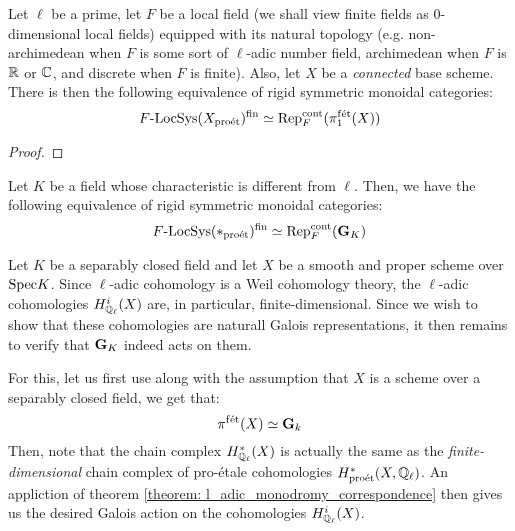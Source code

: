             \begin{theorem} \label{theorem: l_adic_monodromy_correspondence}
                Let $\ell$ be a prime, let $F$ be a local field (we shall view finite fields as $0$-dimensional local fields) equipped with its natural topology (e.g. non-archimedean when $F$ is some sort of $\ell$-adic number field, archimedean when $F$ is $\mathbb{R}$ or $\mathbb{C}$, and discrete when $F$ is finite). Also, let $X$ be a \textit{connected} base scheme. There is then the following equivalence of rigid symmetric monoidal categories:
                    $$F\text{-}\mathrm{LocSys}(X_{\mathrm{pro\acute{e}t}})^{\mathrm{fin}} \simeq \mathrm{Rep}_F^{\mathrm{cont}}(\pi_1^{\mathrm{f\acute{e}t}}(X))$$
            \end{theorem}
                \begin{proof}
                    
                \end{proof}
            \begin{corollary} \label{coro: continuous_galois_representations_as_lisse_sheaves}
                Let $K$ be a field whose characteristic is different from $\ell$. Then, we have the following equivalence of rigid symmetric monoidal categories:
                    $$F\text{-}\mathrm{LocSys}(*_{\mathrm{pro\acute{e}t}})^{\mathrm{fin}} \simeq \mathrm{Rep}_F^{\mathrm{cont}}(\mathbf{G}_K)$$
            \end{corollary}
            \begin{example} \label{example: etale_cohomologies_as_galois_representations}
                Let $K$ be a separably closed field and let $X$ be a smooth and proper scheme over $\mathrm{Spec} K$. Since $\ell$-adic cohomology is a Weil cohomology theory, the $\ell$-adic cohomologies $H^i_{\mathbb{Q}_{\ell}}(X)$ are, in particular, finite-dimensional. Since we wish to show that these cohomologies are naturall Galois representations, it then remains to verify that $\mathbf{G}_K$ indeed acts on them.
                            
                For this, let us first use \cite[\href{https://stacks.math.columbia.edu/tag/0BUM}{Tag 0BUM}]{stacks} along with the assumption that $X$ is a scheme over a separably closed field, we get that:
                    $$\pi^{\mathrm{f\acute{e}t}}(X) \simeq \mathbf{G}_k$$
                Then, note that the chain complex $H^*_{\mathbb{Q}_{\ell}}(X)$ is actually the same as the \textit{finite-dimensional} chain complex of pro-\'etale cohomologies $H^*_{\mathrm{pro\acute{e}t}}(X, \mathbb{Q}_{\ell})$. An appliction of theorem \ref{theorem: l_adic_monodromy_correspondence} then gives us the desired Galois action on the cohomologies $H^i_{\mathbb{Q}_{\ell}}(X)$.
            \end{example}
            
